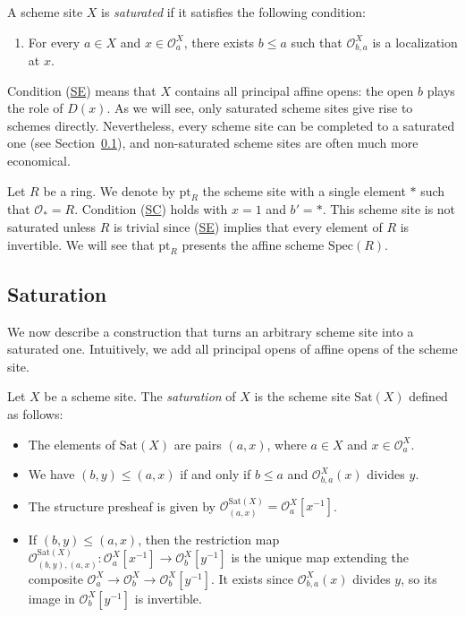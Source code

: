 \documentclass[reqno]{amsart}
\newcommand{\axitem}[1]{\phantomsection \label{ax:#1}}
\newcommand{\axref}[1]{(\hyperref[ax:#1]{#1})}
\theoremstyle{definition}
\theoremstyle{remark}
\numberwithin{figure}{section}
\begin{document}
\begin{defn}
A scheme site $X$ is \emph{saturated} if it satisfies the following condition:
\begin{enumerate}
\item[(SE)] \axitem{SE} For every $a \in X$ and $x \in \mathcal{O}^X_a$, there exists $b \leq a$ such that $\mathcal{O}^X_{b,a}$ is a localization at $x$.
\end{enumerate}
\end{defn}

Condition \axref{SE} means that $X$ contains all principal affine opens: the open $b$ plays the role of $D(x)$.
As we will see, only saturated scheme sites give rise to schemes directly.
Nevertheless, every scheme site can be completed to a saturated one (see Section~\ref{sec:saturation}),
and non-saturated scheme sites are often much more economical.

\begin{example}[point]
Let $R$ be a ring.
We denote by $\mathrm{pt}_R$ the scheme site with a single element $\ast$ such that $\mathcal{O}_\ast = R$.
Condition \axref{SC} holds with $x = 1$ and $b' = \ast$.
This scheme site is not saturated unless $R$ is trivial since \axref{SE} implies that every element of $R$ is invertible.
We will see that $\mathrm{pt}_R$ presents the affine scheme $\mathrm{Spec}(R)$.
\end{example}

\subsection{Saturation}
\label{sec:saturation}

We now describe a construction that turns an arbitrary scheme site into a saturated one.
Intuitively, we add all principal opens of affine opens of the scheme site.

\begin{defn}[sat]
Let $X$ be a scheme site.
The \emph{saturation} of $X$ is the scheme site $\mathrm{Sat}(X)$ defined as follows:
\begin{itemize}
\item The elements of $\mathrm{Sat}(X)$ are pairs $(a,x)$, where $a \in X$ and $x \in \mathcal{O}^X_a$.
\item We have $(b,y) \leq (a,x)$ if and only if $b \leq a$ and $\mathcal{O}^X_{b,a}(x)$ divides $y$.
\item The structure presheaf is given by $\mathcal{O}^{\mathrm{Sat}(X)}_{(a,x)} = \mathcal{O}^X_a[x^{-1}]$.
\item If $(b,y) \leq (a,x)$, then the restriction map $\mathcal{O}^{\mathrm{Sat}(X)}_{(b,y),(a,x)} : \mathcal{O}^X_a[x^{-1}] \to \mathcal{O}^X_b[y^{-1}]$
is the unique map extending the composite $\mathcal{O}^X_a \to \mathcal{O}^X_b \to \mathcal{O}^X_b[y^{-1}]$.
It exists since $\mathcal{O}^X_{b,a}(x)$ divides $y$, so its image in $\mathcal{O}^X_b[y^{-1}]$ is invertible.
\end{itemize}
\end{defn}
\end{document}
